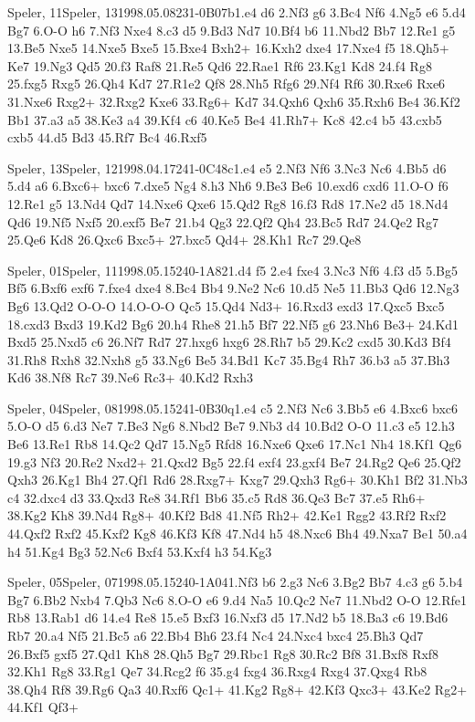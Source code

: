 \documentclass[twocolumn,a4paper,10pt]{report}
\begin{document}
\begin{chessgame}{Speler, 11}{Speler, 13}{1998.05.08}{23}{1-0}{B07b}{1.e4 d6 2.Nf3 g6 3.Bc4 Nf6 4.Ng5 e6 5.d4 Bg7 6.O-O h6 7.Nf3 Nxe4 8.c3 d5 9.Bd3 Nd7 10.Bf4 b6 11.Nbd2 Bb7 12.Re1 g5 13.Be5 Nxe5 14.Nxe5 Bxe5 15.Bxe4 Bxh2+ 16.Kxh2 dxe4 17.Nxe4 f5 18.Qh5+ Ke7 19.Ng3 Qd5 20.f3 Raf8 21.Re5 Qd6 22.Rae1 Rf6 23.Kg1 Kd8 24.f4 Rg8 25.fxg5 Rxg5 26.Qh4 Kd7 27.R1e2 Qf8 28.Nh5 Rfg6 29.Nf4 Rf6 30.Rxe6 Rxe6 31.Nxe6 Rxg2+ 32.Rxg2 Kxe6 33.Rg6+ Kd7 34.Qxh6 Qxh6 35.Rxh6 Be4 36.Kf2 Bb1 37.a3 a5 38.Ke3 a4 39.Kf4 c6 40.Ke5 Be4 41.Rh7+ Kc8 42.c4 b5 43.cxb5 cxb5 44.d5 Bd3 45.Rf7 Bc4 46.Rxf5}\end{chessgame}
\begin{chessgame}{Speler, 13}{Speler, 12}{1998.04.17}{24}{1-0}{C48c}{1.e4 e5 2.Nf3 Nf6 3.Nc3 Nc6 4.Bb5 d6 5.d4 a6 6.Bxc6+ bxc6 7.dxe5 Ng4 8.h3 Nh6 9.Be3 Be6 10.exd6 cxd6 11.O-O f6 12.Re1 g5 13.Nd4 Qd7 14.Nxe6 Qxe6 15.Qd2 Rg8 16.f3 Rd8 17.Ne2 d5 18.Nd4 Qd6 19.Nf5 Nxf5 20.exf5 Be7 21.b4 Qg3 22.Qf2 Qh4 23.Bc5 Rd7 24.Qe2 Rg7 25.Qe6 Kd8 26.Qxc6 Bxc5+ 27.bxc5 Qd4+ 28.Kh1 Rc7 29.Qe8\mate}\end{chessgame}
\begin{chessgame}{Speler, 01}{Speler, 11}{1998.05.15}{24}{0-1}{A82}{1.d4 f5 2.e4 fxe4 3.Nc3 Nf6 4.f3 d5 5.Bg5 Bf5 6.Bxf6 exf6 7.fxe4 dxe4 8.Bc4 Bb4 9.Ne2 Nc6 10.d5 Ne5 11.Bb3 Qd6 12.Ng3 Bg6 13.Qd2 O-O-O 14.O-O-O Qc5 15.Qd4 Nd3+ 16.Rxd3 exd3 17.Qxc5 Bxc5 18.cxd3 Bxd3 19.Kd2 Bg6 20.h4 Rhe8 21.h5 Bf7 22.Nf5 g6 23.Nh6 Be3+ 24.Kd1 Bxd5 25.Nxd5 c6 26.Nf7 Rd7 27.hxg6 hxg6 28.Rh7 b5 29.Kc2 cxd5 30.Kd3 Bf4 31.Rh8 Rxh8 32.Nxh8 g5 33.Ng6 Be5 34.Bd1 Kc7 35.Bg4 Rh7 36.b3 a5 37.Bh3 Kd6 38.Nf8 Rc7 39.Ne6 Rc3+ 40.Kd2 Rxh3}\end{chessgame}
\begin{chessgame}{Speler, 04}{Speler, 08}{1998.05.15}{24}{1-0}{B30q}{1.e4 c5 2.Nf3 Nc6 3.Bb5 e6 4.Bxc6 bxc6 5.O-O d5 6.d3 Ne7 7.Be3 Ng6 8.Nbd2 Be7 9.Nb3 d4 10.Bd2 O-O 11.c3 e5 12.h3 Be6 13.Re1 Rb8 14.Qc2 Qd7 15.Ng5 Rfd8 16.Nxe6 Qxe6 17.Nc1 Nh4 18.Kf1 Qg6 19.g3 Nf3 20.Re2 Nxd2+ 21.Qxd2 Bg5 22.f4 exf4 23.gxf4 Be7 24.Rg2 Qe6 25.Qf2 Qxh3 26.Kg1 Bh4 27.Qf1 Rd6 28.Rxg7+ Kxg7 29.Qxh3 Rg6+ 30.Kh1 Bf2 31.Nb3 c4 32.dxc4 d3 33.Qxd3 Re8 34.Rf1 Bb6 35.c5 Rd8 36.Qe3 Bc7 37.e5 Rh6+ 38.Kg2 Kh8 39.Nd4 Rg8+ 40.Kf2 Bd8 41.Nf5 Rh2+ 42.Ke1 Rgg2 43.Rf2 Rxf2 44.Qxf2 Rxf2 45.Kxf2 Kg8 46.Kf3 Kf8 47.Nd4 h5 48.Nxc6 Bh4 49.Nxa7 Be1 50.a4 h4 51.Kg4 Bg3 52.Nc6 Bxf4 53.Kxf4 h3 54.Kg3}\end{chessgame}
\begin{chessgame}{Speler, 05}{Speler, 07}{1998.05.15}{24}{0-1}{A04}{1.Nf3 b6 2.g3 Nc6 3.Bg2 Bb7 4.c3 g6 5.b4 Bg7 6.Bb2 Nxb4 7.Qb3 Nc6 8.O-O e6 9.d4 Na5 10.Qc2 Ne7 11.Nbd2 O-O 12.Rfe1 Rb8 13.Rab1 d6 14.e4 Re8 15.e5 Bxf3 16.Nxf3 d5 17.Nd2 b5 18.Ba3 c6 19.Bd6 Rb7 20.a4 Nf5 21.Bc5 a6 22.Bb4 Bh6 23.f4 Nc4 24.Nxc4 bxc4 25.Bh3 Qd7 26.Bxf5 gxf5 27.Qd1 Kh8 28.Qh5 Bg7 29.Rbc1 Rg8 30.Rc2 Bf8 31.Bxf8 Rxf8 32.Kh1 Rg8 33.Rg1 Qe7 34.Rcg2 f6 35.g4 fxg4 36.Rxg4 Rxg4 37.Qxg4 Rb8 38.Qh4 Rf8 39.Rg6 Qa3 40.Rxf6 Qc1+ 41.Kg2 Rg8+ 42.Kf3 Qxc3+ 43.Ke2 Rg2+ 44.Kf1 Qf3+}\end{chessgame}
\end{document}
